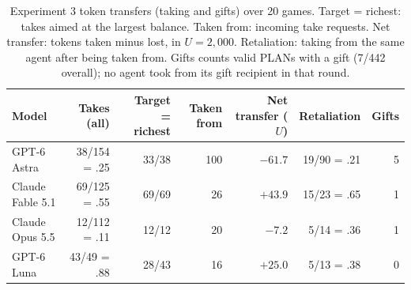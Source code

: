 \begin{table}[!t]
\centering\footnotesize
\setlength{\tabcolsep}{4pt}
\caption{Experiment 3 token transfers (taking and gifts) over 20 games. Target = richest: takes aimed at the largest balance. Taken from: incoming take requests. Net transfer: tokens taken minus lost, in $U=2{,}000$. Retaliation: taking from the same agent after being taken from. Gifts counts valid PLANs with a gift (7/442 overall); no agent took from its gift recipient in that round.}
\label{tab:arena-take-detail}
\begin{tabular}{@{}lrrrrrr@{}}
\toprule
Model & Takes (all) & Target = richest & Taken from & Net transfer ($U$) & Retaliation & Gifts \\
\midrule
GPT-6 Astra & 38/154 = .25 & 33/38 & 100 & $-61.7$ & 19/90 = .21 & 5 \\
Claude Fable 5.1 & 69/125 = .55 & 69/69 & 26 & $+43.9$ & 15/23 = .65 & 1 \\
Claude Opus 5.5 & 12/112 = .11 & 12/12 & 20 & $-7.2$ & 5/14 = .36 & 1 \\
GPT-6 Luna & 43/49 = .88 & 28/43 & 16 & $+25.0$ & 5/13 = .38 & 0 \\
\bottomrule
\end{tabular}
\end{table}
